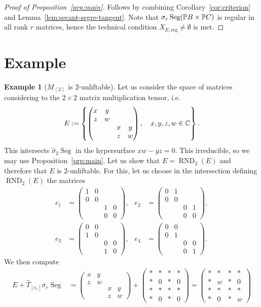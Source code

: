 \documentclass[a4paper,10pt]{article}
\def\reg{\text{reg}}
\def\set#1{\left\{#1\right\}}
\def\gener#1{\left\langle#1\right\rangle}
\def\mtrx#1{\begin{pmatrix}#1\end{pmatrix}}
\DeclareMathOperator{\RND}{RND}
\DeclareMathOperator{\Seg}{Seg}
\theoremstyle{definition}
\newtheorem{example}[theorem]{Example}
\theoremstyle{remark}
\begin{document}
\begin{proof}[Proof of Proposition~\ref{prp:main}]
    Follows by combining Corollary~\ref{cor:criterion} and Lemma~\ref{lem:secant-segre-tangent}. Note that $\sigma_r\Seg(\pe B\times\pe C)$
    is regular in all rank $r$ matrices, hence the technical condition $X_{E,\reg}\neq\emptyset$ is met.
\end{proof}


\section{Example}

\begin{example}[$M_{\gener2}$ is $2$-unliftable]
    Let us consider the space of matrices considering to the $2\times2$ matrix multiplication tensor, i.e.
    \[
        E := \set{\mtrx{x&y&&\\z&w&&\\&&x&y\\&&z&w},\quad x,y,z,w\in\ce}.
    \]
    This intersects $\hat\sigma_2\Seg$ in the hypersurface $xw-yz=0$. This irreducible, so we may use Proposition~\ref{prp:main}. Let us show that $E=\RND_2(E)$ and therefore that $E$ is $2$-unliftable. For this, let us choose in the intersection defining $\RND_2(E)$ the matrices
    \begin{align*}
        e_1 &= \mtrx{1&0&&\\0&0&&\\&&1&0\\&&0&0}, &
        e_2 &= \mtrx{0&1&&\\0&0&&\\&&0&1\\&&0&0}, \\
        e_3 &= \mtrx{0&0&&\\1&0&&\\&&0&0\\&&1&0}, &
        e_4 &= \mtrx{0&0&&\\0&1&&\\&&0&0\\&&0&1}.
    \end{align*}
    We then compute
    \begin{align*}
        E+\hat T_{[e_1]}\sigma_r\Seg &= \mtrx{x&y&&\\z&w&&\\&&x&y\\&&z&w} + \mtrx{*&*&*&*\\ *&0&*&0\\ *&*&*&*\\ *&0&*&0} = \mtrx{*&*&*&*\\ *&w&*&0\\ *&*&*&*\\ *&0&*&w}

\end{align*}
\end{example}
\end{document}

